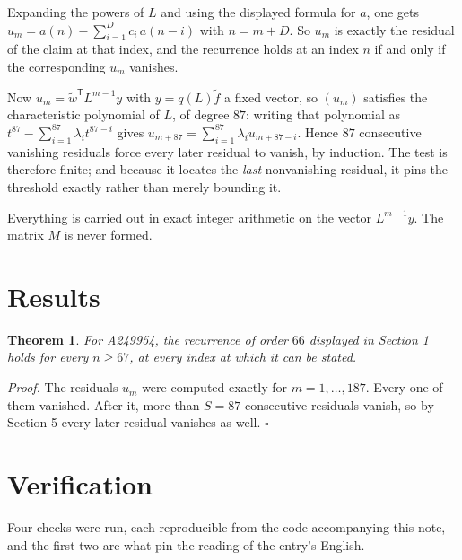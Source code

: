 \documentclass[11pt]{article}
\newtheorem{theorem}{Theorem}
\theoremstyle{definition}
\begin{document}
Expanding the powers of $L$ and using the displayed formula for $a$, one gets $u_m = a(n) - \sum_{i=1}^{D} c_i\,a(n-i)$ with $n = m + D$. So $u_m$ is exactly the residual of the claim at that index, and the recurrence holds at an index $n$ if and only if the corresponding $u_m$ vanishes.

Now $u_m = \tilde w^{\mathsf T} L^{m-1} y$ with $y = q(L)\tilde f$ a fixed vector, so $(u_m)$ satisfies the characteristic polynomial of $L$, of degree $87$: writing that polynomial as $t^{87} - \sum_{i=1}^{87} \lambda_i t^{87-i}$ gives $u_{m+87} = \sum_{i=1}^{87} \lambda_i u_{m+87-i}$. Hence $87$ consecutive vanishing residuals force every later residual to vanish, by induction. The test is therefore finite; and because it locates the {\itshape last} nonvanishing residual, it pins the threshold exactly rather than merely bounding it.

Everything is carried out in exact integer arithmetic on the vector $L^{m-1}y$. The matrix $M$ is never formed.

\section{Results}

\begin{theorem} For A249954, the recurrence of order $66$ displayed in Section 1 holds for every $n \ge 67$, at every index at which it can be stated.\end{theorem}

{\itshape Proof.} The residuals $u_m$ were computed exactly for $m = 1,\dots,187$. Every one of them vanished. After it, more than $S = 87$ consecutive residuals vanish, so by Section 5 every later residual vanishes as well. $\square$

\section{Verification}

Four checks were run, each reproducible from the code accompanying this note, and the first two are what pin the reading of the entry's English.
\end{document}
